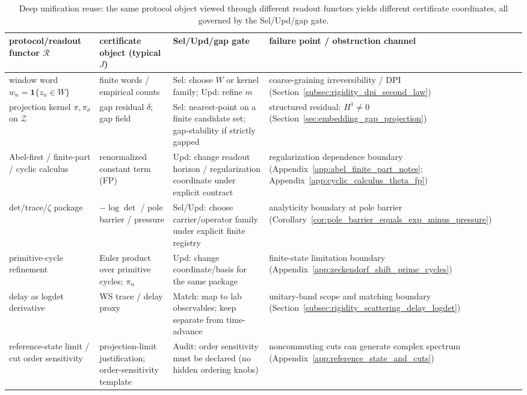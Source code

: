 \begin{table}[t]
\centering
\scriptsize
\setlength{\tabcolsep}{5pt}
\renewcommand{\arraystretch}{1.15}
\begin{tabular}{p{} p{} p{} p{}}
\toprule
protocol/readout functor $\mathcal{R}$ & certificate object (typical $J$) & Sel/Upd/gap gate & failure point / obstruction channel \\
\midrule
window word $w_n=\mathbf{1}\{z_n\in W\}$ &
finite words / empirical counts &
Sel: choose $W$ or kernel family; Upd: refine $m$ &
coarse-graining irreversibility / DPI (Section~\ref{subsec:rigidity_dpi_second_law}) \\

projection kernel $\pi,\pi_\sigma$ on $\mathcal{Z}$ &
gap residual $\delta$; gap field &
Sel: nearest-point on a finite candidate set; gap-stability if strictly gapped &
structured residual: $H^1\neq 0$ (Section~\ref{sec:embedding_gap_projection}) \\

Abel-first / finite-part / cyclic calculus &
renormalized constant term (FP) &
Upd: change readout horizon / regularization coordinate under explicit contract &
regularization dependence boundary (Appendix~\ref{app:abel_finite_part_notes}; Appendix~\ref{app:cyclic_calculus_theta_fp}) \\

det/trace/\texorpdfstring{$\zeta$}{zeta} package &
$-\log\det$ / pole barrier / pressure &
Sel/Upd: choose carrier/operator family under explicit finite registry &
analyticity boundary at pole barrier (Corollary~\ref{cor:pole_barrier_equals_exp_minus_pressure}) \\

primitive-cycle refinement &
Euler product over primitive cycles; $\pi_n$ &
Upd: change coordinate/basis for the same package &
finite-state limitation boundary (Appendix~\ref{app:zeckendorf_shift_prime_cycles}) \\

delay as logdet derivative &
WS trace / delay proxy &
Match: map to lab observables; keep separate from time-advance &
unitary-band scope and matching boundary (Section~\ref{subsec:rigidity_scattering_delay_logdet}) \\

reference-state limit / cut order sensitivity &
projection-limit justification; order-sensitivity template &
Audit: order sensitivity must be declared (no hidden ordering knobs) &
noncommuting cuts can generate complex spectrum (Appendix~\ref{app:reference_state_and_cuts}) \\
\bottomrule
\end{tabular}
\caption{Deep unification reuse: the same protocol object viewed through different readout functors yields different certificate coordinates, all governed by the Sel/Upd/gap gate.}
\label{tab:protocol_readout_certificate_gate}
\end{table}

